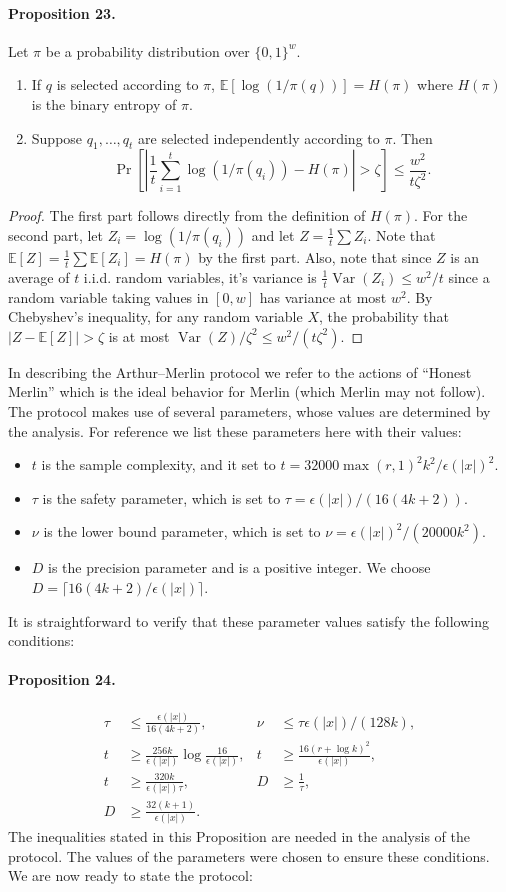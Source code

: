 \paragraph{Proposition 23.} Let $\pi$ be a probability distribution over $\{0,1\}^w$.
\begin{enumerate}\item If $q$ is selected according to $\pi$, $\mathbb E[\log(1/\pi(q))]=H(\pi)$ where $H(\pi)$ is the binary entropy of $\pi$.
\item Suppose $q_1,\ldots,q_t$ are selected independently according to $\pi$. Then
\[\Pr\left[\left|\frac1t\sum_{i=1}^t\log(1/\pi(q_i))-H(\pi)\right|>\zeta\right]\le\frac{w^2}{t\zeta^2}.\]\end{enumerate}
\begin{proof}The first part follows directly from the definition of $H(\pi)$. For the second part, let $Z_i=\log(1/\pi(q_i))$ and let $Z=\frac1t\sum Z_i$. Note that $\mathbb E[Z]=\frac1t\sum\mathbb E[Z_i]=H(\pi)$ by the first part. Also, note that since $Z$ is an average of $t$ i.i.d. random variables, it's variance is $\frac1t\operatorname{Var}(Z_i)\le w^2/t$ since a random variable taking values in $[0,w]$ has variance at most $w^2$. By Chebyshev's inequality, for any random variable $X$, the probability that $|Z-\mathbb E[Z]|>\zeta$ is at most $\operatorname{Var}(Z)/\zeta^2\le w^2/(t\zeta^2)$.\end{proof}
In describing the Arthur--Merlin protocol we refer to the actions of ``Honest Merlin'' which is the ideal behavior for Merlin (which Merlin may not follow). The protocol makes use of several parameters, whose values are determined by the analysis. For reference we list these parameters here with their values:
\begin{itemize}\item $t$ is the sample complexity, and it set to $t=32000\max(r,1)^2k^2/\epsilon(|x|)^2$.
\item $\tau$ is the safety parameter, which is set to $\tau=\epsilon(|x|)/(16(4k+2))$.
\item $\nu$ is the lower bound parameter, which is set to $\nu=\epsilon(|x|)^2/(20000k^2)$.
\item $D$ is the precision parameter and is a positive integer. We choose $D=\lceil16(4k+2)/\epsilon(|x|)\rceil$.\end{itemize}
It is straightforward to verify that these parameter values satisfy the following conditions:
\paragraph{Proposition 24.}
\begin{align*}
\tau&\le\frac{\epsilon(|x|)}{16(4k+2)},& \nu&\le\tau\epsilon(|x|)/(128k),\\
t&\ge\frac{256k}{\epsilon(|x|)}\log\frac{16}{\epsilon(|x|)},& t&\ge\frac{16(r+\log k)^2}{\epsilon(|x|)},\\
t&\ge\frac{320k}{\epsilon(|x|)\tau},&D&\ge\frac1\tau,\\
D&\ge\frac{32(k+1)}{\epsilon(|x|)}.&&
\end{align*}
The inequalities stated in this Proposition are needed in the analysis of the protocol. The values of the parameters were chosen to ensure these conditions. We are now ready to state the protocol:
